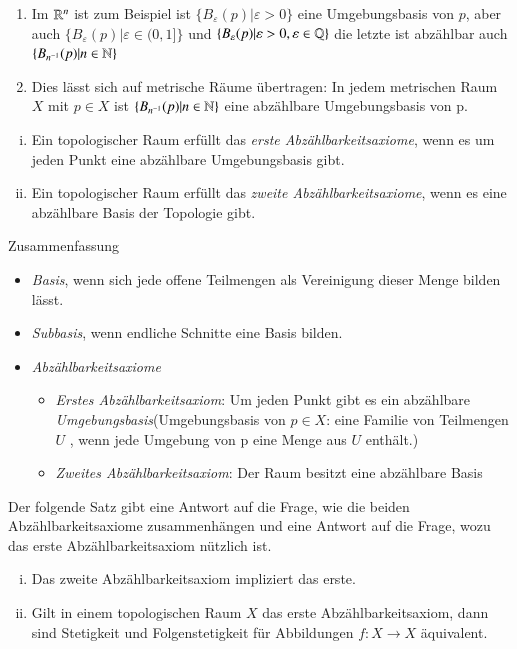 \documentclass[a4paper,10pt]{scrartcl}
\newcommand{\eps}{\varepsilon}
\begin{document}
\begin{exs*}
 \begin{enumerate}
\item  Im $\mathbb{R}^n$ ist zum Beispiel ist $
 \{B_\eps(p)|\eps>0\}$ eine Umgebungsbasis von $p$, aber auch $ \{B_\eps(p)|\eps\in (0,1]\}$ und $\{ B_\eps(p)|\eps>0,\eps\in \Q \}$ die letzte ist abzählbar auch $\{B_{n^{-1}}(p)|n\in \mathbb{N}\}$
\item Dies lässt sich auf metrische Räume übertragen: In jedem metrischen Raum $X$ mit $p\in X$ ist $\{B_{n^{-1}}(p)|n\in \mathbb{N}\}$ eine abzählbare Umgebungsbasis von p.
 \end{enumerate}
\begin{df}
 \begin{enumerate}[(i)]
  \item Ein topologischer Raum erfüllt das \emph{erste Abzählbarkeitsaxiome}, wenn es um jeden Punkt eine abzählbare Umgebungsbasis gibt. 
\item Ein topologischer Raum erfüllt das \emph{zweite Abzählbarkeitsaxiome}, wenn es eine abzählbare Basis der Topologie gibt.
 \end{enumerate}

\end{df}
\end{exs*}
\begin{seg}{Zusammenfassung}
\begin{itemize}
 \item \emph{Basis}, wenn sich jede offene Teilmengen als Vereinigung dieser Menge bilden lässt.
 \item \emph{Subbasis}, wenn endliche Schnitte eine Basis bilden.
 \item \emph{Abzählbarkeitsaxiome}
 \begin{itemize}
\item \emph{Erstes Abzählbarkeitsaxiom}: Um jeden Punkt gibt es ein abzählbare \emph{Umgebungsbasis}(Umgebungsbasis von $p\in X$: eine Familie von Teilmengen $U$
, wenn jede Umgebung von p eine Menge aus $U$ enthält.)
\item \emph{Zweites Abzählbarkeitsaxiom}: Der Raum besitzt eine abzählbare Basis
\end{itemize}
\end{itemize}
\end{seg}
Der folgende Satz gibt eine Antwort auf die Frage, wie die beiden Abzählbarkeitsaxiome zusammenhängen und eine Antwort auf die Frage, wozu das erste Abzählbarkeitsaxiom nützlich ist.
\begin{st}\label{thm:5.6}
 \begin{enumerate}[(i)]
  \item Das zweite Abzählbarkeitsaxiom impliziert das erste.
  \item Gilt in einem topologischen Raum $X$ das erste Abzählbarkeitsaxiom, dann sind Stetigkeit und Folgenstetigkeit für Abbildungen $f:X\to X$ äquivalent.
 \end{enumerate}
\end{st}
\end{document}
